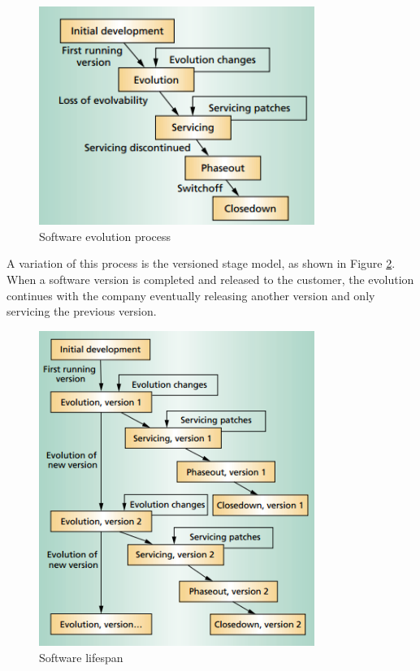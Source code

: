 {\begin{figure}[ht!]
	\centering
	\includegraphics[width=0.8\textwidth]{images/lifespan-1.png}
	\caption{Software evolution process}
	\label{fig:lifespan-1}
\end{figure}

A variation of this process is the versioned stage model, as shown in Figure \ref{fig:lifespan-2}. When a software version is completed and released to the customer, the evolution continues with the company eventually releasing another version and only servicing the previous version. 

\begin{figure}[ht!]
	\centering
	\includegraphics[width=0.8\textwidth]{images/lifespan-2.png}
	\caption{Software lifespan}
	\label{fig:lifespan-2}
\end{figure}

}

